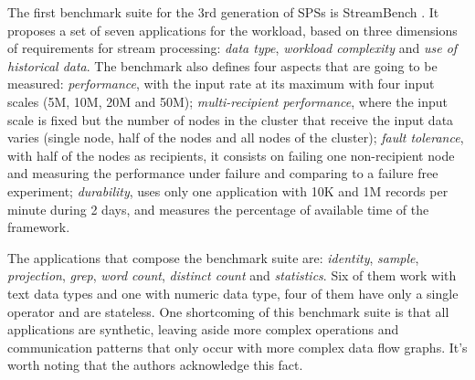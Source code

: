 \documentclass[ppgc,diss,english]{iiufrgs}
\begin{document}


The first benchmark suite for the 3rd generation of SPSs is StreamBench \cite{lu2014stream}. It proposes a set of seven applications for the workload, based on three dimensions of requirements for stream processing: \emph{data type}, \emph{workload complexity} and \emph{use of historical data}. The benchmark also defines four aspects that are going to be measured: \emph{performance}, with the input rate at its maximum with four input scales (5M, 10M, 20M and 50M); \emph{multi-recipient performance}, where the input scale is fixed but the number of nodes in the cluster that receive the input data varies (single node, half of the nodes and all nodes of the cluster); \emph{fault tolerance}, with half of the nodes as recipients, it consists on failing one non-recipient node and measuring the performance under failure and comparing to a failure free experiment; \emph{durability}, uses only one application with 10K and 1M records per minute during 2 days, and measures the percentage of available time of the framework.

The applications that compose the benchmark suite are: \emph{identity}, \emph{sample}, \emph{projection}, \emph{grep}, \emph{word count}, \emph{distinct count} and \emph{statistics}. Six of them work with text data types and one with numeric data type, four of them have only a single operator and are stateless. One shortcoming of this benchmark suite is that all applications are synthetic, leaving aside more complex operations and communication patterns that only occur with more complex data flow graphs. It's worth noting that the authors acknowledge this fact.
\end{document}
